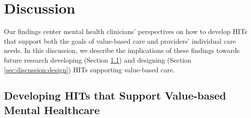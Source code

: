 \section{Discussion}
\label{sec:discussion}
Our findings center mental health clinicians' perspectives on how to develop HITs that support both the goals of value-based care and providers' individual care needs.
In this discussion, we describe the implications of these findings towards future research developing (Section \ref{sec:discussion:tech}) and designing (Section \ref{sec:discussion:design}) HITs supporting value-based care.



\subsection{Developing HITs that Support Value-based Mental Healthcare}
\label{sec:discussion:tech}

